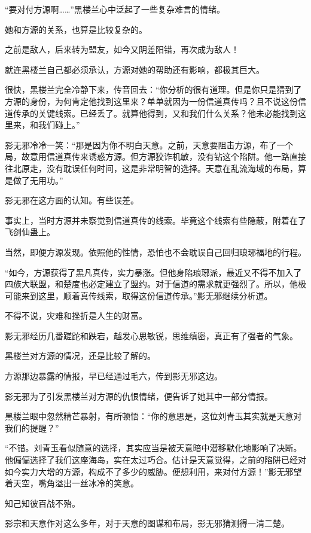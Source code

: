 \begin{this_body}
“要对付方源啊……”黑楼兰心中泛起了一些复杂难言的情绪。

她和方源的关系，也算是比较复杂的。

之前是敌人，后来转为盟友，如今又阴差阳错，再次成为敌人！

就连黑楼兰自己都必须承认，方源对她的帮助还有影响，都极其巨大。

很快，黑楼兰完全冷静下来，传音回去：“你分析的很有道理。但是你只是猜到了方源的身份，为何肯定他找到这里来？单单就因为一份信道真传吗？且不说这份信道传承的关键线索。已经丢了。就算他得到，又和我们什么关系？他未必能找到这里来，和我们碰上。”

影无邪冷冷一笑：“那是因为你不明白天意。之前，天意要阻击方源，布了一个局，故意用信道真传来诱惑方源。但方源狡诈机敏，没有钻这个陷阱。他一路直接往北原走，没有耽误任何时间，这是非常明智的选择。天意在乱流海域的布局，算是做了无用功。”

影无邪在这方面的认知。有些误差。

事实上，当时方源并未察觉到信道真传的线索。毕竟这个线索有些隐蔽，附着在了飞剑仙蛊上。

当然，即便方源发现。依照他的性情，恐怕也不会耽误自己回归琅琊福地的行程。

“如今，方源获得了黑凡真传，实力暴涨。但他身陷琅琊派，最近又不得不加入了四族大联盟，和楚度也必定建立了盟约。对于信道的需求就更强烈了。所以，他极可能来到这里，顺着真传线索，取得这份信道传承。”影无邪继续分析道。

不得不说，灾难和挫折是人生的财富。

影无邪经历几番蹉跎和跌宕，越发心思敏锐，思维缜密，真正有了强者的气象。

黑楼兰对方源的情况，还是比较了解的。

方源那边暴露的情报，早已经通过毛六，传到影无邪这边。

影无邪为了引发黑楼兰对方源的仇恨情绪，便告诉了她其中一部分情报。

黑楼兰眼中忽然精芒暴射，有所顿悟：“你的意思是，这位刘青玉其实就是天意对我们的提醒？”

“不错。刘青玉看似随意的选择，其实应当是被天意暗中潜移默化地影响了决断。他偏偏选择了我们这座海岛，实在太过巧合。估计是天意觉得，之前的陷阱已经对如今实力大增的方源，构成不了多少的威胁。便想利用，来对付方源！”影无邪望着天空，嘴角溢出一丝冰冷的笑意。

知己知彼百战不殆。

影宗和天意作对这么多年，对于天意的图谋和布局，影无邪猜测得一清二楚。


\end{this_body}
